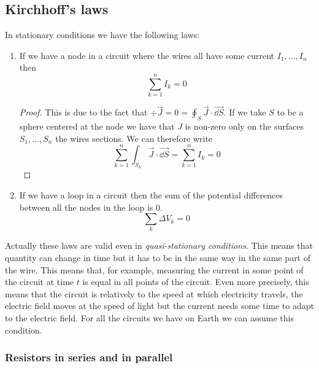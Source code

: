 \documentclass[12pt]{extarticle}
\begin{document}
\subsection{Kirchhoff's laws}

In stationary conditions we have the following laws:
\begin{enumerate}
    \item If we have a node in a circuit where the wires all have some current $I_1, \dots, I_n$ then
          \begin{equation}
              \sum_{k=1}^{n} I_k = 0
          \end{equation}
          \begin{proof}
              This is due to the fact that $\div \vec J = 0 = \oint_S \vec J \cdot \vec{\dd S}$.
              If we take $S$ to be a sphere centered at the node we have that $J$ is non-zero only on the surfaces
              $S_1, \dots, S_n$ the wires sections.
              We can therefore write
              \begin{equation}
                  \sum_{k = 1}^n \int_{S_k} \vec J \cdot \vec{\dd S} = \sum_{k = 1}^n I_k = 0
              \end{equation}
          \end{proof}

    \item If we have a loop in a circuit then the sum of the potential differences between
          all the nodes in the loop is 0.
          \begin{equation}
              \sum_k \Delta V_k = 0
          \end{equation}
\end{enumerate}

Actually these laws are valid even in \emph{quasi-stationary conditions}.
This means that quantity can change in time but it has to be in the same way in the same part of the wire.
This means that, for example, measuring the current in some point of the circuit at time $t$ is equal in all
points of the circuit.
Even more precisely, this means that the circuit is  relatively to the speed at which electricity travels,
the electric field moves at the speed of light but the current needs some time to adapt to the electric field.
For all the circuits we have on Earth we can assume this condition.

\subsubsection{Resistors in series and in parallel}
\end{document}

